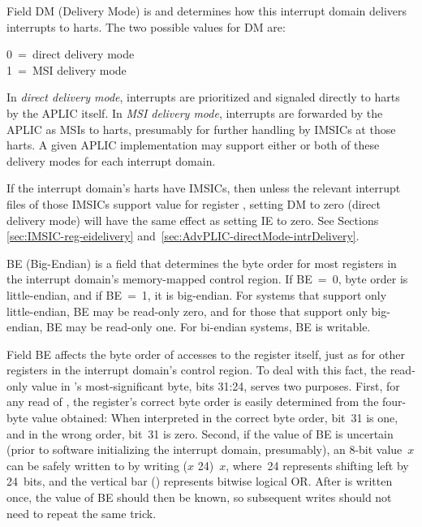 Field DM (Delivery Mode) is {\WARL} and determines how this interrupt
domain delivers interrupts to harts.
The two possible values for DM are:
\begin{displayLinesTable}
0~=~direct delivery mode\\
1~=~MSI delivery mode\\
\end{displayLinesTable}
In \emph{direct delivery mode}, interrupts are prioritized and signaled
directly to harts by the APLIC itself.
In \emph{MSI delivery mode}, interrupts are forwarded by the APLIC
as MSIs to harts, presumably for further handling by IMSICs at those
harts.
A given APLIC implementation may support either or both of these
delivery modes for each interrupt domain.

If the interrupt domain's harts have IMSICs,
then unless the relevant interrupt
files of those IMSICs support value  for register
, setting DM to zero (direct delivery mode) will
have the same effect as setting IE to zero.
See Sections \ref{sec:IMSIC-reg-eidelivery}
and~\ref{sec:AdvPLIC-directMode-intrDelivery}.

BE (Big-Endian) is a {\WARL} field that determines the byte order for
most registers in the interrupt domain's memory-mapped control region.
If BE~=~0, byte order is little-endian, and if BE~=~1, it is
big-endian.
For {\RISCV} systems that support only little-endian, BE may be
read-only zero, and for those that support only big-endian, BE may be
read-only one.
For bi-endian systems, BE is writable.

Field BE affects the byte order of accesses to the 
register itself, just as for other registers in the interrupt domain's
control region.
To deal with this fact, the read-only value in 's
most-significant byte, bits 31:24, serves two purposes.
First, for any read of , the register's correct byte order
is easily determined from the four-byte value obtained:
When interpreted in the correct byte order, bit~31 is one, and in the
wrong order, bit~31 is zero.
Second, if the value of BE is uncertain (prior to software
initializing the interrupt domain, presumably), an \mbox{8-bit}
value~$x$ can be safely written to  by writing
\mbox{($x$\,\z{<<}\,24) \z{|} $x$}, where \mbox{\z{<<}\,24} represents
shifting left by 24~bits, and the vertical bar (\z{|}) represents
bitwise logical OR.
After  is written once, the value of BE should then be
known, so subsequent writes should not need to repeat the same trick.


